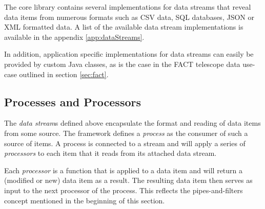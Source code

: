 The core \streams library contains several implementations for data
streams that reveal data items from numerous formats such as CSV data,
SQL databases, JSON or XML formatted data. A list of the available
data stream implementations is available in the appendix \ref{app:dataStreams}.

In addition, application specific implementations for data streams can
easily be provided by custom Java classes, as is the case in the FACT
telescope data use-case outlined in section \ref{sec:fact}.

%


%
%

\subsection{\label{sec:basics}Processes and Processors}
The {\em data stream}s defined above encapsulate the format and reading
of data items from some source. The \streams framework defines a
{\em process} as the consumer of such a source of items. A process is
connected to a stream and will apply a series of {\em processors} to
each item that it reads from its attached data stream.

Each {\em processor} is a function that is applied to a data item and
will return a (modified or new) data item as a result. The resulting
data item then serves as input to the next processor of the
process. This reflects the pipes-and-filters concept mentioned in the
beginning of this section.

